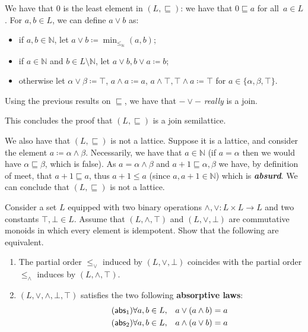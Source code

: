 \documentclass[fontsize=16pt,a4paper,DIV=17,parskip=half]{scrartcl}
\let\mathds\mathbb
\theoremstyle{definition}
\begin{document}
  We have that $0$ is the least element in $(L, \sqsubseteq)$: we have that $0 \sqsubseteq a$ for all~$a \in L$.
  For $a, b \in L$, we can define $a \vee b$ as:
   \begin{itemize}
     \item if $a, b \in \mathds{N}$, let $a \vee b \coloneqq \min_{\le_{\mathds{N}}}(a, b)$;
     \item if $a \in \mathds{N}$ and $b \in L \setminus \mathds{N}$, let $a \vee b, b \vee a \coloneqq b$;
     \item otherwise let $\alpha \vee \beta \coloneqq \top$, $a \wedge a \coloneqq a$, $a \wedge \top, \top \wedge a \coloneqq \top$ for $a \in \{\alpha,\beta, \top \}$.
  \end{itemize}
  Using the previous results on $\sqsubseteq$, we have that $-\vee-$ \textit{really} is a join.

  This concludes the proof that $(L, \sqsubseteq)$ is a join semilattice.

  We also have that $(L, \sqsubseteq)$ is not a lattice.
  Suppose it is a lattice, and consider the element $a \coloneqq \alpha \wedge \beta$.
  Necessarily, we have that $a \in \mathds{N}$ (if $a = \alpha$ then we would have $\alpha \sqsubseteq \beta$, which is false).
  As $a = \alpha \wedge \beta$ and $a + 1 \sqsubseteq \alpha, \beta$ we have, by definition of meet, that $a + 1  \sqsubseteq a$, thus $a + 1 \le a$ (since $a, a+1 \in \mathds{N}$) which is \textit{\textbf{absurd}}.
  We can conclude that $(L, \sqsubseteq)$ is not a lattice.


  \begin{que}
    Consider a set $L$ equipped with two binary operations $\wedge, \vee : L \times L \to L$ and two constants $\top , \bot  \in L$.
    Assume that $(L, \wedge, \top)$ and $(L, \vee, \bot)$ are commutative monoids in which every element is idempotent.
    Show that the following are equivalent.
    \begin{enumerate}
      \item The partial order $\le_\vee$  induced by $(L, \vee, \bot)$ coincides with the partial order $\le_\wedge$ induces by $(L, \wedge, \top)$.
        \label{q9-1}
      \item $(L, \vee, \wedge, \bot, \top)$ satisfies the two following \textbf{absorptive laws}:
        \label{q9-2}
        \begin{align}
          \tag{\textsf{abs}\textsubscript{1}}
          \forall a, b \in L, \quad &a \vee (a \wedge b) = a
          \label{abs1}
          \\
          \tag{\textsf{abs}\textsubscript{2}}
          \forall a, b \in L, \quad &a \wedge (a \vee b) = a
          \label{abs2}
        \end{align}
    \end{enumerate}
  \end{que}
\end{document}
